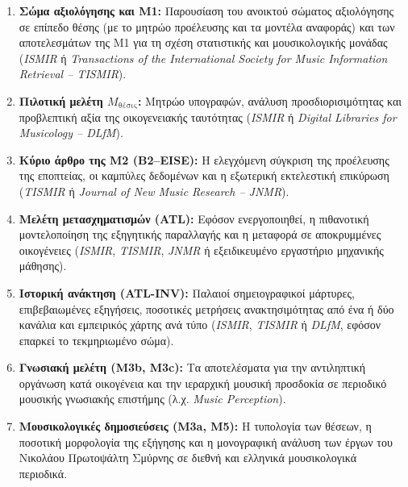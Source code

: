 \documentclass[11pt,a4paper]{article}
\begin{document}
\begin{enumerate}
\def\labelenumi{\arabic{enumi}.}
\item
  \textbf{Σώμα αξιολόγησης και Μ1:} Παρουσίαση του ανοικτού σώματος αξιολόγησης σε επίπεδο θέσης (με το μητρώο προέλευσης και τα μοντέλα αναφοράς) και των αποτελεσμάτων της Μ1 για τη σχέση στατιστικής και μουσικολογικής μονάδας (\emph{ISMIR} ή \emph{Transactions of the International Society for Music Information Retrieval -- TISMIR}).
\item
  \textbf{Πιλοτική μελέτη \(M_{\text{θέσις}}\):} Μητρώο υπογραφών, ανάλυση προσδιορισιμότητας και προβλεπτική αξία της οικογενειακής ταυτότητας (\emph{ISMIR} ή \emph{Digital Libraries for Musicology -- DLfM}).
\item
  \textbf{Κύριο άρθρο της Μ2 (B2--EISE):} Η ελεγχόμενη σύγκριση της προέλευσης της εποπτείας, οι καμπύλες δεδομένων και η εξωτερική εκτελεστική επικύρωση (\emph{TISMIR} ή \emph{Journal of New Music Research -- JNMR}).
\item
  \textbf{Μελέτη μετασχηματισμών (ATL):} Εφόσον ενεργοποιηθεί, η πιθανοτική μοντελοποίηση της εξηγητικής παραλλαγής και η μεταφορά σε αποκρυμμένες οικογένειες (\emph{ISMIR}, \emph{TISMIR}, \emph{JNMR} ή εξειδικευμένο εργαστήριο μηχανικής μάθησης).
\item
  \textbf{Ιστορική ανάκτηση (ATL-INV):} Παλαιοί σημειογραφικοί μάρτυρες, επιβεβαιωμένες εξηγήσεις, ποσοτικές μετρήσεις ανακτησιμότητας από ένα ή δύο κανάλια και εμπειρικός χάρτης ανά τύπο (\emph{ISMIR}, \emph{TISMIR} ή \emph{DLfM}, εφόσον επαρκεί το τεκμηριωμένο σώμα).
\item
  \textbf{Γνωσιακή μελέτη (Μ3b, Μ3c):} Τα αποτελέσματα για την αντιληπτική οργάνωση κατά οικογένεια και την ιεραρχική μουσική προσδοκία σε περιοδικό μουσικής γνωσιακής επιστήμης (λ.χ. \emph{Music Perception}).
\item
  \textbf{Μουσικολογικές δημοσιεύσεις (Μ3a, Μ5):} Η τυπολογία των θέσεων, η ποσοτική μορφολογία της εξήγησης και η μονογραφική ανάλυση των έργων του Νικολάου Πρωτοψάλτη Σμύρνης σε διεθνή και ελληνικά μουσικολογικά περιοδικά.
\end{enumerate}
\end{document}
